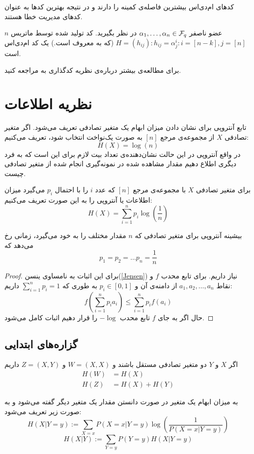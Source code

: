 کدهای ام‌دی‌اس بیشترین فاصله‌ی کمینه را دارند و در نتیجه بهترین کدها به عنوان کدهای مدیریت خطا هستند.
\begin{example}
	$n$
	عضو ناصفر
	$\alpha_1, \ldots, \alpha_n \in \mathcal{F}_q$
	در نظر بگیرید. کد تولید شده توسط ماتریس 
	$H = (h_{ij}): h_{ij} = \alpha_j^i: i = [n - k], j = [n]$
	(که به
	 معروف است.) یک کد ام‌دی‌اس است.
\end{example}

	برای مطالعه‌ی بیشتر درباره‌ی نظریه کدگذاری به
\cite{book:coding}
مراجعه کنید.
\section{نظریه اطلاعات}
تابع آنتروپی برای نشان دادن میزان ابهام یک متغیر تصادفی تعریف می‌شود. اگر متغیر تصادفی
$X$
از مجموعه‌ی مرجع
$[n]$
به صورت یک‌نواخت انتخاب شود، تعریف می‌کنیم:
$$H(X) = \log(n)$$
در واقع آنتروپی در این حالت نشان‌دهنده‌ی تعداد بیت لازم برای این است که به فرد دیگری اطلاع دهیم مقدار مشاهده شده در نمونه‌گیری انجام شده از متغیر تصادفی چیست. 


\begin{definition}[آنتروپی]
برای متغیر تصادفی
$X$
با مجموعه‌ی مرجع
$[n]$
که عدد
$i$
را با احتمال
$p_i$
می‌گیرد میزان اطلاعات یا آنتروپی را به این صورت تعریف می‌کنیم:
$$H(X) = \sum_{i = 1}^{n} p_i \log(\frac{1}{n})$$
\end{definition}
\begin{theorem}
بیشینه آنتروپی برای متغیر تصادفی که
$n$
مقدار مختلف را به خود می‌گیرد، زمانی رخ می‌دهد که
$$p_1 = p_2 = \dots p_n = \frac{1}{n}$$
\end{theorem}
\begin{proof}
برای این اثبات به نامساوی ینسن(\autoref{Jensen})
 نیاز داریم. برای تابع محدب
$f$
و نقاط
$a_1, a_2, \dots, a_n$
از دامنه‌ی آن و
$p_i \in [0, 1]$
به طوری که
$\sum_{i = 1}^{n} p_i = 1$
داریم:
$$f(\sum_{i = 1}^{n} p_i a_i) \leq \sum_{i = 1}^{n} p_i f(a_i)$$
حال اگر به جای
$f$
تابع محدب
$-\log$
را قرار دهیم اثبات کامل می‌شود.
\end{proof}

\subsection{گزاره‌های ابتدایی}
\begin{theorem}
اگر
$X$
و
$Y$
دو متغیر تصادفی مستقل باشند و
$W = (X, X)$
و
$Z = (X, Y)$
داریم
\begin{align*}
    H(W) &= H(X) \\
    H(Z) &= H(X) + H(Y)
\end{align*}
\end{theorem}
\begin{definition}
	به میزان ابهام یک متغیر در صورت دانستن مقدار یک متغیر دیگر گفته می‌شود و به صورت زیر تعریف می‌شود:
$$H(X | Y = y) := \sum_{X = x} P(X = x| Y = y) \log(\frac{1}{P(X = x| Y = y)})$$
$$H(X|Y) := \sum_{Y = y} P(Y = y) H(X | Y = y)$$
\end{definition}

